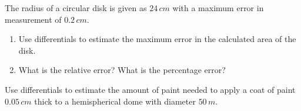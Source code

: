 \documentclass[../mathNotesPreamble]{subfiles}
\begin{document}
\begin{ex*}
  The radius of a circular disk is given as $24\,cm$ with a maximum error in measurement of $0.2\,cm$.
\end{ex*}
\begin{enumerate}[label=\alph*), itemsep=\stretch{1}]
  \item Use differentials to estimate the maximum error in the calculated area of the disk.
  \item What is the relative error? What is the percentage error?
\end{enumerate}
\pagebreak

\begin{ex*}
  Use differentials to estimate the amount of paint needed to apply a coat of paint $0.05\,cm$ thick to a hemispherical dome with diameter $50\,m$.
\end{ex*}
\pagebreak
\end{document}
